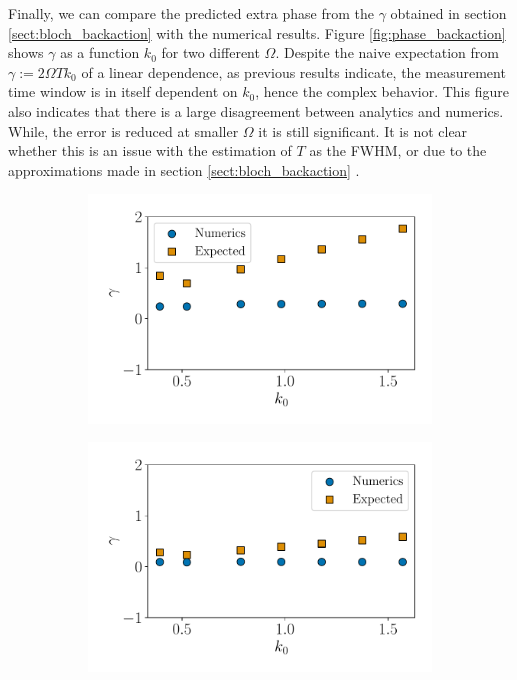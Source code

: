 \documentclass{article}
\newcommand\sj[1]{ {\color{orange} #1} }
\begin{document}
Finally, we can compare the predicted extra phase from the $\gamma$ obtained in section 
\ref{sect:bloch_backaction} with the numerical results. 
Figure \ref{fig:phase_backaction} shows $\gamma$ as a function $k_0$ for two different $\Omega$.
Despite the naive expectation from $\gamma := 2\Omega T k_0$ of a linear dependence,
as previous results indicate, the measurement time window is in itself dependent on $k_0$, 
hence the complex behavior. This figure also indicates that there is a large 
disagreement between analytics and numerics. While, the error is reduced at smaller $\Omega$ 
it is still significant. \sj{It is not clear whether this is an issue with the estimation 
of $T$ as the FWHM, or due to the approximations made in section \ref{sect:bloch_backaction}}. 

\begin{figure}[h]
    \centering
    \begin{subfigure}[b]{0.45\textwidth}
        \includegraphics[width=\textwidth]{figures/report_04_2025/extra_phase_om=0.3.pdf}
        \caption{}
    \end{subfigure}
    \hspace{0.001\textwidth}
    \begin{subfigure}[b]{0.45\textwidth}
        \includegraphics[width=\textwidth]{figures/report_04_2025/extra_phase_om=0.1.pdf}

\end{subfigure}
\end{figure}
\end{document}
